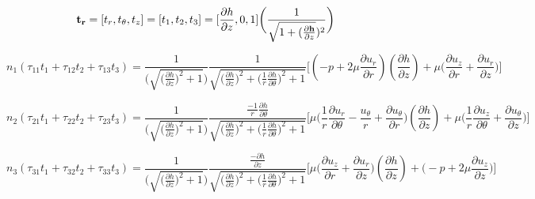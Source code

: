 \documentclass{article}
\begin{document}
{\begin{equation*}
{\bf t_{r}} = [t_{r} ,t_{\theta}, t_{z}] = [t_{1} ,t_{2}, t_{3}] =  [{\frac{\partial h}{\partial z}}, 0 , 1]\bigg(\frac{1}{\sqrt{1 + (\frac{\partial {\bf h}}{\partial z}})^2}\bigg)
\end{equation*}

\begin{equation}
n_{1}(\tau_{11}t_{1} + \tau_{12}t_{2} + \tau_{13}t_{3}) = \frac{1}{\bigg(\sqrt{\bigg(\frac{\partial h}{\partial z}\bigg)^2 +  1}\bigg)}\frac{1}{\sqrt{\bigg(\frac{\partial h}{\partial z}\bigg)^2 + \bigg(\frac{1}{r}\frac{\partial h}{\partial \theta}\bigg)^2 + 1}}\bigg[(-p + 2\mu \frac{\partial u_{r}}{\partial r})(\frac{\partial h}{\partial z}) + \mu \bigg(\frac{\partial u_{z}}{\partial r} + \frac{\partial u_{r}}{\partial z}\bigg)\bigg]
\end{equation}

\begin{equation}
 n_{2}(\tau_{21}t_{1} + \tau_{22}t_{2} + \tau_{23}t_{3}) = \frac{1}{\bigg(\sqrt{\bigg(\frac{\partial h}{\partial z}\bigg)^2 +  1}\bigg)}\frac{\frac{-1}{r}\frac{\partial h}{\partial \theta}}{\sqrt{\bigg(\frac{\partial h}{\partial z}\bigg)^2 + \bigg(\frac{1}{r}\frac{\partial h}{\partial \theta}\bigg)^2 + 1}}\bigg[\mu \bigg(\frac{1}{r}\frac{\partial u_{r}}{\partial \theta} -\frac{u_{\theta}}{r}+\frac{\partial u_{\theta}}{\partial r}\bigg)(\frac{\partial h}{\partial z}) + \mu \bigg(\frac{1}{r}\frac{\partial u_{z}}{\partial \theta} + \frac{\partial u_{\theta}}{\partial z}\bigg)\bigg]
\end{equation}


\begin{equation}
n_{3}(\tau_{31}t_{1} + \tau_{32}t_{2} + \tau_{33}t_{3}) = \frac{1}{\bigg(\sqrt{\bigg(\frac{\partial h}{\partial z}\bigg)^2 +  1}\bigg)}\frac{\frac{-\partial h}{\partial z}}{\sqrt{\bigg(\frac{\partial h}{\partial z}\bigg)^2 + \bigg(\frac{1}{r}\frac{\partial h}{\partial \theta}\bigg)^2 + 1}}\bigg[\mu \bigg(\frac{\partial u_{z}}{\partial r} + \frac{\partial u_{r}}{\partial z}\bigg)(\frac{\partial h}{\partial z}) + \bigg(-p + 2\mu \frac{\partial u_{z}}{\partial z}\bigg)\bigg]
\end{equation}
\newline

}
\end{document}
